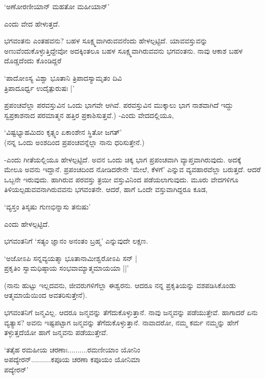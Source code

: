 \begin{shloka}
`ಅಣೋರಣೀಯಾನ್ ಮಹತೋ ಮಹೀಯಾನ್'
\end{shloka}

ಎಂದು ವೇದ ಹೇಳುತ್ತದೆ.

ಭಗವಂತನು ಎಂತಹವನು? ಬಹಳ ಸೂಕ್ಷ್ಮವಾಗಿರುವವನೆಂದು ಹೇಳಲ್ಪಟ್ಟಿದೆ. ಯಾವವಸ್ತುವನ್ನು ಅಣುವೆಂದುಕೊಳ್ಳುತ್ತಿದ್ದೇವೋ ಅದಕ್ಕಿಂತಲೂ ಬಹಳ ಸೂಕ್ಷ್ಮವಾಗಿರುವವನು ಭಗವಂತನು. ನಾವು ಆಕಾಶ ಬಹಳ ದೊಡ್ಡದೆಂದು ಕೊಂಡಿದ್ದರೆ 

\begin{shloka}
`ಪಾದೋಽಸ್ಯ ವಿಶ್ವಾ ಭೂತಾನಿ ತ್ರಿಪಾದಸ್ಯಾಮೃತಂ ದಿವಿ\\
ತ್ರಿಪಾದೂರ್ಧ್ವ ಉದೈತ್ಪುರುಷಃ‌ |'
\end{shloka}

ಪ್ರಪಂಚವೆಲ್ಲಾ ಪರವಸ್ತುವಿನ ಒಂದು ಭಾಗವೇ ಆಗಿವೆ. ಪರವಸ್ತುವಿನ ಮುಕ್ಕಾಲು ಭಾಗ ನಾಶವಾಗಿದೆ ಇದ್ದು ಸ್ವಪ್ರಕಾಶನಾದ ಪರಮಾತ್ಮನ ಹತ್ತಿರ ಪ್ರಕಾಶಿಸುತ್ತವೆ.) -ಎಂದು ವೇದದಲ್ಲಿಯೂ,

\begin{shloka}
`ವಿಷ್ಟಭ್ಯಾಹಮಿದಂ ಕೃತ್ಸ್ನಂ ಏಕಾಂಶೇನ ಸ್ಥಿತೋ ಜಗತ್'\\
(ನನ್ನ ಒಂದು ಅಂಶದಿಂದ ಪ್ರಪಂಚವನ್ನೆಲ್ಲಾ ನಾನು ಧರಿಸುತ್ತೇನೆ.)
\end{shloka}

-ಎಂದು ಗೀತೆಯಲ್ಲಿಯೂ ಹೇಳಲ್ಪಟ್ಟಿದೆ. ಅವನ ಒಂದು ಚಿಕ್ಕ ಭಾಗ ಪ್ರಪಂಚವಾಗಿ ವ್ಯಾಪ್ತವಾಗಿರುವುದು. ಅದಕ್ಕೆ ಮೇಲೂ ಅವನು ಇದ್ದಾನೆ. ಪ್ರಪಂಚದಿಂದ ನೋಡಿದರೇನೇ `ಮೇಲೆ, ಕೆಳಗೆ' ಎನ್ನುವ ವ್ಯವಹಾರವೆಲ್ಲಾ ಬರುತ್ತದೆ. ಆದರೆ ಒಬ್ಬನೇ ಇರುವುದು. ಹಾಗಿರುವ ಪರವಸ್ತು ತ್ರಯೀ ವಸ್ತುವಿನಿಂದ ಪಡೆಯಲಾಗುವುದು. ಮೂರು ವೇದಗಳಿಗೂ ತಿಳಿಯಲ್ಪಡುವವನಾಗಿರುವವನು ಭಗವಂತನೇ. ಆದರೆ, ಹಾಗೆ ಒಂದೇ ವಸ್ತುವಾಗಿದ್ದರೂ ಕೂಡ,

\begin{shloka}
`ವ್ಯಸ್ತಂ ತಿಸೃಷು ಗುಣಭಿನ್ನಾಸು ತನುಷು'
\end{shloka}

ಎಂದು ಹೇಳಲ್ಪಟ್ಟಿದೆ.

ಭಗವಂತನಿಗೆ `ಸತ್ಯಂ ಜ್ಞಾನಂ ಅನಂತಂ ಬ್ರಹ್ಮ' ಎನ್ನುವುದೇ ಲಕ್ಷಣ.

\begin{shloka}
`ಅಜೋಽಪಿ ಸನ್ನವ್ಯಯತ್ಮಾ ಭೂತಾನಾಮೀಶ್ವರೋಽಪಿ ಸನ್ |\\
ಪ್ರಕೃತಿಂ ಸ್ವಾಮಧಿಷ್ಠಾಯ ಸಂಭವಾಮ್ಯಾತ್ಮಮಾಯಯಾ ||'
\end{shloka}

(ನಾನು ಹುಟ್ಟು ಇಲ್ಲದವನು, ಜೀವರುಗಳಿಗೆಲ್ಲಾ ಈಶ್ವರನು. ಆದರೂ ನನ್ನ ಪ್ರಕೃತಿಯನ್ನು ವಶಪಡಿಸಿಕೊಂಡು ಆತ್ಮಮಾಯೆಯಿಂದ ಅವತರಿಸುತ್ತೇನೆ).


ಭಗವಂತನಿಗೆ ಜನ್ಮವಿಲ್ಲ. ಆದರೂ ಜನ್ಮವನ್ನು ತೆಗೆದುಕೊಳ್ಳುತ್ತಾನೆ. ನಾವು ಜನ್ಮವನ್ನು ಪಡೆಯುತ್ತೇವೆ. ಹಾಗಾದರೆ ಏನು ವ್ಯತ್ಯಾಸ? ಅವನು ಇಷ್ಟಪಟ್ಟಾಗ ಜನ್ಮವನ್ನು ತೆಗೆದುಕೊಳ್ಳುತ್ತಾನೆ. ನಾವಾದರೋ, ನಮ್ಮ ಕರ್ಮ ನಮ್ಮನ್ನು ಹೇಗೆ ತಳ್ಳುತ್ತದೆಯೋ ಹಾಗೆ ಜನ್ಮವನು ಪಡೆಯುತ್ತೇವೆ.

\begin{shloka}
`ತತೈಹ ರಮಹೀಯ ಚರಣಾಃ..........ರಮಣೀಯಾಂ ಯೋನಿಂ\\
ಅಪದ್ಯೇರನ್..........ಕಪೂಯ ಚರಣಾ ಕಪೂಯಂ ಯೋನಿಮಾ\\
ಪದ್ಯೇರನ್'
\end{shloka}

